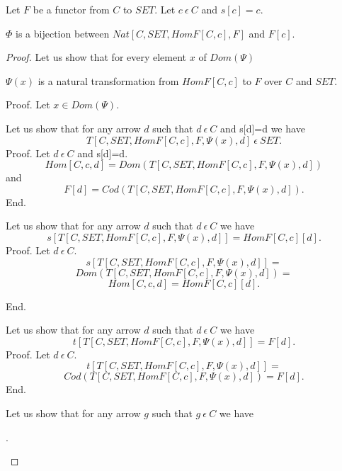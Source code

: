 \documentclass{article}
\newcommand{\inn}{~\epsilon~}
\newcommand{\innn}{~\epsilon~} %
\begin{document}
	\begin{forthel}
	
		\begin{lemma}[Yoneda]
		Let $F$ be a functor from $C$ to $SET$. Let $c \innn C$ and $s[c]=c$. 
		\begin{center}
			$\Phi$ is a bijection between $Nat[C,SET,HomF[C,c],F]$ and $F[c]$.
		\end{center}							
		\end{lemma}
		\begin{proof}


		Let us show that for every element $x$ of $Dom(\Psi)$
		\begin{center}		
			$\Psi(x)$ is a natural transformation from $HomF[C,c]$ to $F$ over $C$ and $SET$.
		\end{center}
		
   			Proof.
   			Let $x\in Dom(\Psi)$.
			
			Let us show that for any arrow $d$ such that $d \inn C$ and s[d]=d we have
			$$T[C,SET,HomF[C,c],F,\Psi(x),d] \inn SET.$$ 
			Proof.
			Let $d \innn C$ and s[d]=d.
			$$Hom[C,c,d] = Dom(T[C,SET,HomF[C,c],F,\Psi(x),d])$$ 
			and $$F[d] = Cod(T[C,SET,HomF[C,c],F,\Psi(x),d]).$$			
			End.
			
			Let us show that for any arrow $d$ such that $d \inn C$ we have
			$$s[T[C,SET,HomF[C,c],F,\Psi(x),d]] = HomF[C,c][d].$$
			Proof.
			Let $d \innn C$.
			$$s[T[C,SET,HomF[C,c],F,\Psi(x),d]] =$$			
			$$Dom(T[C,SET,HomF[C,c],F,\Psi(x),d]) =$$			
			$$Hom[C,c,d] = HomF[C,c][d].$$
			
			End.
			
			Let us show that for any arrow $d$ such that $d \inn C$ we have
			$$t[T[C,SET,HomF[C,c],F,\Psi(x),d]] = F[d].$$
			Proof.
			Let $d \innn C$.
			$$t[T[C,SET,HomF[C,c],F,\Psi(x),d]] =$$ 			
			$$Cod(T[C,SET,HomF[C,c],F,\Psi(x),d]) = F[d].$$			
			End.
			
			Let us show that for any arrow $g$ such that $g \inn C$ we have
			\begin{center}
				.
			\end{center}
		

\end{proof}
\end{forthel}
\end{document}

